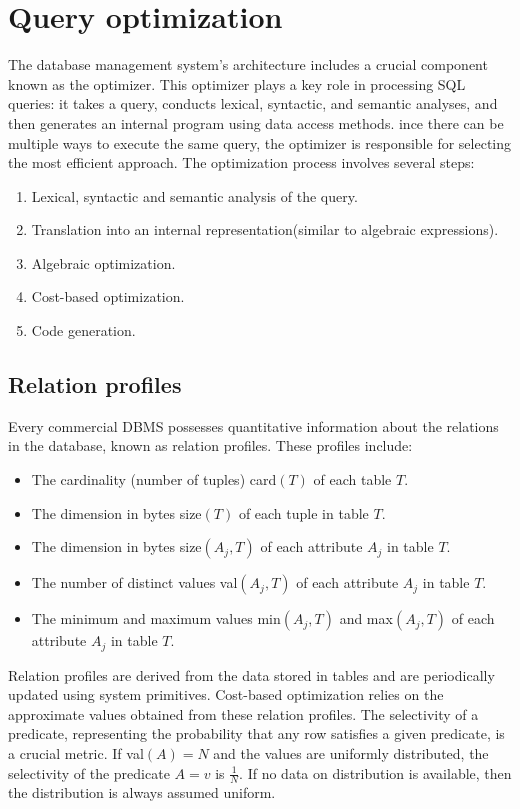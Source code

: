 \section{Query optimization}

The database management system's architecture includes a crucial component known as the optimizer. 
This optimizer plays a key role in processing SQL queries: it takes a query, conducts lexical, syntactic, and semantic analyses, and then generates an internal program using data access methods.
ince there can be multiple ways to execute the same query, the optimizer is responsible for selecting the most efficient approach.
The optimization process involves several steps:
\begin{enumerate}
    \item Lexical, syntactic and semantic analysis of the query.
    \item Translation into an internal representation(similar to algebraic expressions). 
    \item Algebraic optimization.
    \item Cost-based optimization.
    \item Code generation.
\end{enumerate}

\subsection{Relation profiles}
Every commercial DBMS possesses quantitative information about the relations in the database, known as relation profiles. 
These profiles include:
\begin{itemize}
    \item The cardinality (number of tuples) card$(T)$ of each table $T$.
    \item The dimension in bytes size$(T)$ of each tuple in table $T$.
    \item The dimension in bytes size$(A_j, T)$ of each attribute $A_j$ in table $T$.
    \item The number of distinct values val$(A_j, T)$ of each attribute $A_j$ in table $T$.
    \item The minimum and maximum values min$(A_j, T)$ and max$(A_j, T)$ of each attribute $A_j$ in table $T$.
\end{itemize}
Relation profiles are derived from the data stored in tables and are periodically updated using system primitives. 
Cost-based optimization relies on the approximate values obtained from these relation profiles.
The selectivity of a predicate, representing the probability that any row satisfies a given predicate, is a crucial metric.
If val$(A) = N$ and the values are uniformly distributed, the selectivity of the predicate $A = v$ is $\frac{1}{N}$.
If no data on distribution is available, then the distribution is always assumed uniform.

